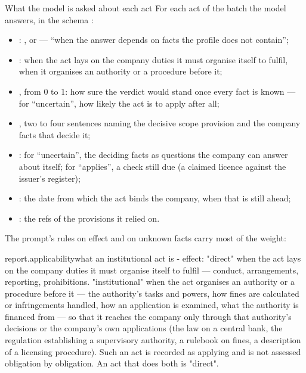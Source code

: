 \begin{aibox}{What the model is asked about each act}
For each act of the batch the model answers, in the schema :
\begin{itemize}
  \item {}: ,  or  ---
    \enquote{when the answer depends on facts the profile does not contain};
  \item {}:  when the act lays on the company duties it must organise
    itself to fulfil,  when it organises an authority or a procedure
    before it;
  \item {}, from 0 to 1: how sure the verdict would stand once every fact is
    known --- for \enquote{uncertain}, how likely the act is to apply after all;
  \item {}, two to four sentences naming the decisive scope provision and the
    company facts that decide it;
  \item {}: for \enquote{uncertain}, the deciding facts as questions the
    company can answer about itself; for \enquote{applies}, a check still due (a claimed licence
    against the issuer's register);
  \item {}: the date from which the act binds the company, when that is still
    ahead;
  \item {}: the refs of the provisions it relied on.
\end{itemize}
\end{aibox}

The prompt's rules on effect and on unknown facts carry most of the weight:

\begin{promptexcerpt}{report.applicability}{what an institutional act is}
  - effect: "direct" when the act lays on the company duties it must organise itself
    to fulfil — conduct, arrangements, reporting, prohibitions. "institutional" when
    the act organises an authority or a procedure before it — the authority's tasks
    and powers, how fines are calculated or infringements handled, how an application
    is examined, what the authority is financed from — so that it reaches the company
    only through that authority's decisions or the company's own applications (the
    law on a central bank, the regulation establishing a supervisory authority, a
    rulebook on fines, a description of a licensing procedure). Such an act is
    recorded as applying and is not assessed obligation by obligation. An act that
    does both is "direct".
\end{promptexcerpt}

